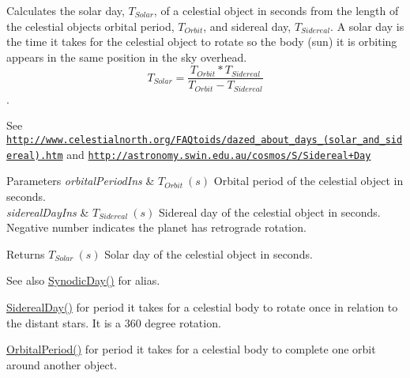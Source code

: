 Calculates the solar day, $T_{Solar}$, of a celestial object in seconds from the length of the celestial object\textquotesingle{}s orbital period, $T_{Orbit}$, and sidereal day, $T_{Sidereal}$. A solar day is the time it takes for the celestial object to rotate so the body (sun) it is orbiting appears in the same position in the sky overhead. \[ T_{Solar}=\dfrac{T_{Orbit} * T_{Sidereal}}{T_{Orbit} - T_{Sidereal}}\]. 

See \href{http://www.celestialnorth.org/FAQtoids/dazed_about_days_(solar_and_sidereal).htm}{\tt http\+://www.\+celestialnorth.\+org/\+F\+A\+Qtoids/dazed\+\_\+about\+\_\+days\+\_\+(solar\+\_\+and\+\_\+sidereal).\+htm} and \href{http://astronomy.swin.edu.au/cosmos/S/Sidereal+Day}{\tt http\+://astronomy.\+swin.\+edu.\+au/cosmos/\+S/\+Sidereal+\+Day}


\begin{DoxyParams}{Parameters}
{\em orbital\+Period\+Ins} & $ T_{Orbit}\ (s)$ Orbital period of the celestial object in seconds. \\
\hline
{\em sidereal\+Day\+Ins} & $ T_{Sidereal}\ (s)$ Sidereal day of the celestial object in seconds. Negative number indicates the planet has retrograde rotation. \\
\hline
\end{DoxyParams}
\begin{DoxyReturn}{Returns}
$ T_{Solar}\ (s)$ Solar day of the celestial object in seconds. 
\end{DoxyReturn}
\begin{DoxySeeAlso}{See also}
\mbox{\hyperlink{group___e_g_x_phys-_astrophysic-_synodic_day_ga637140842bc008c87d90e65b551cbac7}{Synodic\+Day()}} for alias. 

\mbox{\hyperlink{group___e_g_x_phys-_astrophysic-_sidereal_day_ga587900d5fc755228c1bb5121cd7965c6}{Sidereal\+Day()}} for period it takes for a celestial body to rotate once in relation to the distant stars. It is a 360 degree rotation. 

\mbox{\hyperlink{group___e_g_x_phys-_astrophysic-_orbital_period_ga76aac7afe3b7a30a785259e9eeb0c139}{Orbital\+Period()}} for period it takes for a celestial body to complete one orbit around another object. 
\end{DoxySeeAlso}

